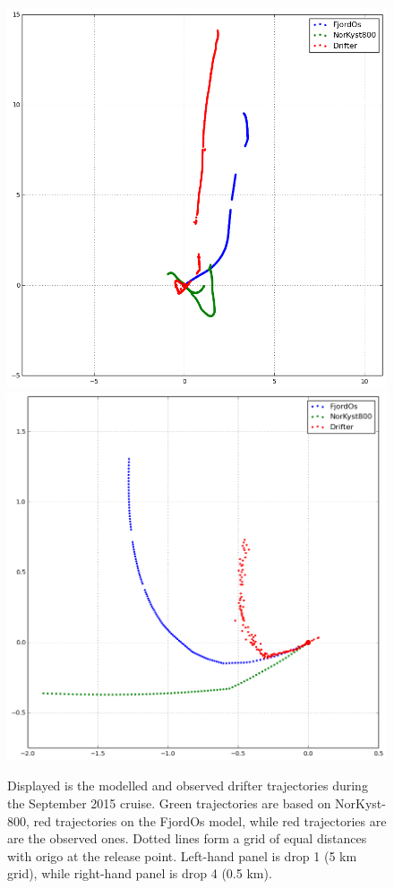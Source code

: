 \begin{figure}[htb]
	\centerline{
		\includegraphics*[width=.5\textwidth]{Figurer/opendrift/skillscore/drop1i0}
		\includegraphics*[width=.5\textwidth]{Figurer/opendrift/skillscore/drop4i7}
		}
	\caption{\small Displayed is the modelled and observed drifter trajectories during the September 2015 cruise. Green trajectories are based on NorKyst-800, red trajectories on the FjordOs model, while red trajectories are are the observed ones. Dotted lines form a grid of equal distances with origo at the release point. Left-hand panel is drop 1 (5 km grid), while right-hand panel is drop 4 (0.5 km).}
	\label{fig:opendrift_trajectories1}
\end{figure}

